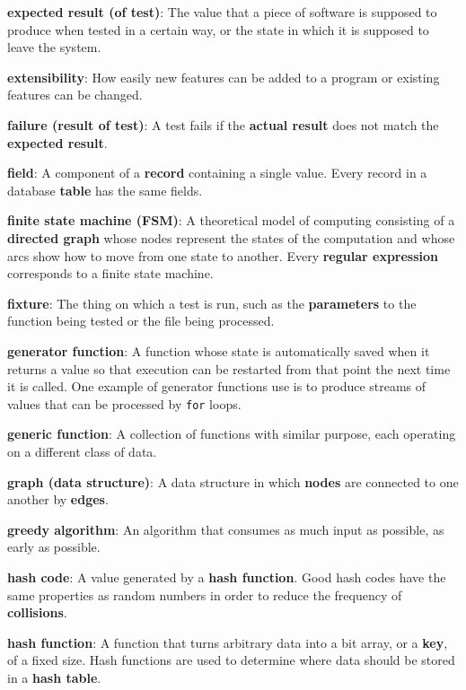 \documentclass{scrbook}
\newcommand{\glosskey}[1]{\textbf{#1}}
\begin{document}
\noindent \textbf{\glosskey{expected result (of test)}}: 
The value that a piece of software is supposed to produce when tested in a certain way, or the state in which it is supposed to leave the system.


\noindent \textbf{\glosskey{extensibility}}: 
How easily new features can be added to a program or existing features can be changed.


\noindent \textbf{\glosskey{failure (result of test)}}: 
A test fails if the \glosskey{actual result} does not match the \glosskey{expected result}.


\noindent \textbf{\glosskey{field}}: 
A component of a \glosskey{record} containing a single value. Every record in a database \glosskey{table} has the same fields.


\noindent \textbf{\glosskey{finite state machine} (FSM)}: 
A theoretical model of computing consisting of a \glosskey{directed graph} whose nodes represent the states of the computation and whose arcs show how to move from one state to another. Every \glosskey{regular expression} corresponds to a finite state machine.


\noindent \textbf{\glosskey{fixture}}: 
The thing on which a test is run, such as the \glosskey{parameters} to the function being tested or the file being processed.


\noindent \textbf{\glosskey{generator function}}: 
A function whose state is automatically saved when it returns a value so that execution can be restarted from that point the next time it is called. One example of generator functions use is to produce streams of values that can be processed by \texttt{for} loops.


\noindent \textbf{\glosskey{generic function}}: 
A collection of functions with similar purpose, each operating on a different class of data.


\noindent \textbf{\glosskey{graph (data structure)}}: 
A data structure in which \glosskey{nodes} are connected to one another by \glosskey{edges}.


\noindent \textbf{\glosskey{greedy algorithm}}: 
An algorithm that consumes as much input as possible, as early as possible.


\noindent \textbf{\glosskey{hash code}}: 
A value generated by a \glosskey{hash function}. Good hash codes have the same properties as random numbers in order to reduce the frequency of \glosskey{collisions}.


\noindent \textbf{\glosskey{hash function}}: 
A function that turns arbitrary data into a bit array, or a \glosskey{key}, of a fixed size. Hash functions are used to determine where data should be stored in a \glosskey{hash table}.
\end{document}
